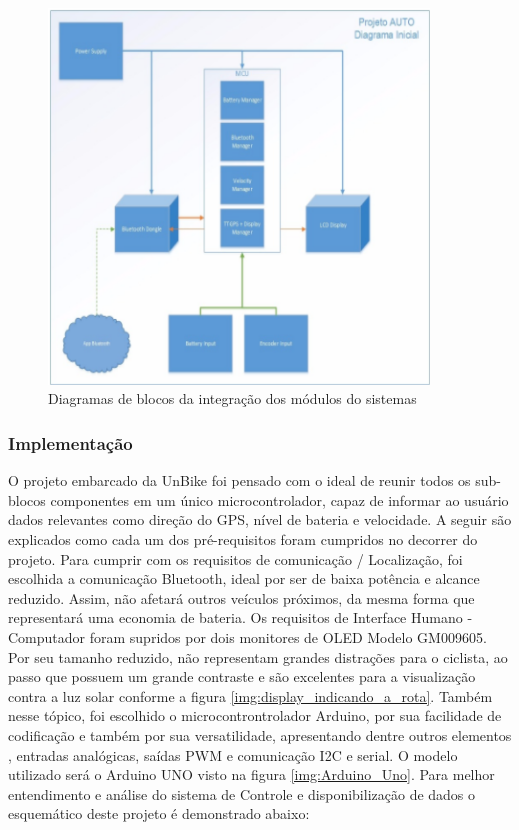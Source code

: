  			\graphicspath{{figuras/}}
 			\begin{figure}[h!]
 				\centering
 				\includegraphics[width=0.9\textwidth]{Figura6_Diagrama_de_modulos_do_sistema.PNG}
 				\caption{Diagramas de blocos da integração dos módulos do sistemas}
 				\label{img:Diagrama_de_modulos_do_sistema}
 			\end{figure}
 		 		
		\subsubsection{Implementação}
		O projeto embarcado da UnBike foi pensado com o ideal de reunir todos os sub-blocos componentes em um único microcontrolador, capaz de informar ao usuário dados relevantes como direção do GPS, nível de bateria e velocidade. A seguir são explicados como cada um dos pré-requisitos foram cumpridos no decorrer do projeto.
		Para cumprir com os requisitos de  comunicação / Localização, foi escolhida a comunicação Bluetooth, ideal por ser de baixa potência e alcance reduzido. Assim, não afetará outros veículos próximos, da mesma forma que representará uma economia de bateria. 
		Os requisitos de Interface Humano - Computador foram supridos por dois monitores de OLED Modelo GM009605. Por seu tamanho reduzido, não representam grandes distrações para o ciclista, ao passo que possuem um grande contraste e são excelentes para a visualização contra a luz solar conforme a figura \ref{img:display_indicando_a_rota}. Também nesse tópico, foi escolhido o microcontrontrolador Arduino, por sua facilidade de codificação e também por sua versatilidade, apresentando dentre outros elementos , entradas analógicas, saídas PWM e comunicação I2C e serial. O modelo utilizado será o Arduino UNO visto na figura \ref{img:Arduino_Uno}.
		Para melhor entendimento e análise do sistema de Controle e disponibilização de dados o esquemático deste projeto é demonstrado abaixo:
		
